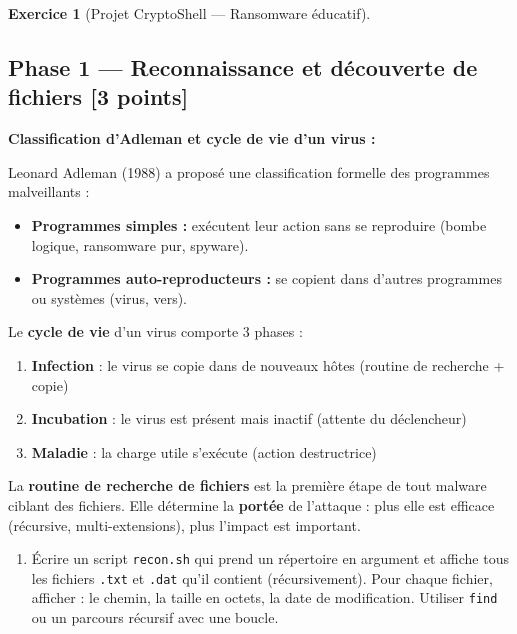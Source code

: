 \documentclass[a4paper,11pt]{article}
\theoremstyle{plain}
\theoremstyle{definition}
\newtheorem{exercice}{Exercice}
\begin{document}
\begin{exercice}[Projet CryptoShell --- Ransomware éducatif]$\;$


\subsection*{Phase 1 --- Reconnaissance et découverte de fichiers \hfill \normalsize [3 points]}

\begin{rappel}
\textbf{Classification d'Adleman et cycle de vie d'un virus :}

Leonard Adleman (1988) a proposé une classification formelle des programmes malveillants :
\begin{itemize}
    \item \textbf{Programmes simples :} exécutent leur action sans se reproduire (bombe logique, ransomware pur, spyware).
    \item \textbf{Programmes auto-reproducteurs :} se copient dans d'autres programmes ou systèmes (virus, vers).
\end{itemize}

\medskip
Le \textbf{cycle de vie} d'un virus comporte 3 phases :
\begin{enumerate}
    \item \textbf{Infection} : le virus se copie dans de nouveaux hôtes (routine de recherche + copie)
    \item \textbf{Incubation} : le virus est présent mais inactif (attente du déclencheur)
    \item \textbf{Maladie} : la charge utile s'exécute (action destructrice)
\end{enumerate}

\medskip
La \textbf{routine de recherche de fichiers} est la première étape de tout malware ciblant des fichiers. Elle détermine la \textbf{portée} de l'attaque : plus elle est efficace (récursive, multi-extensions), plus l'impact est important.
\end{rappel}

\begin{enumerate}
\item[\textbf{1a)}] Écrire un script \texttt{recon.sh} qui prend un répertoire en argument et affiche tous les fichiers \texttt{.txt} et \texttt{.dat} qu'il contient (récursivement). Pour chaque fichier, afficher : le chemin, la taille en octets, la date de modification. Utiliser \texttt{find} ou un parcours récursif avec une boucle.


\end{enumerate}
\end{exercice}
\end{document}
